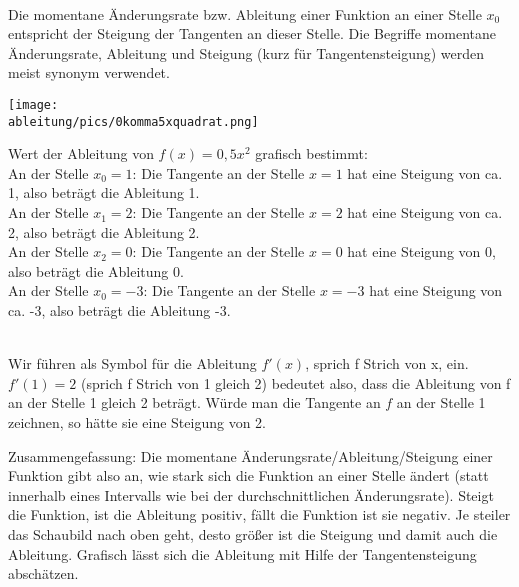 \documentclass[a4paper,12pt, headsepline, ngerman]{scrartcl}
\theoremstyle{definition}
\begin{document}
\begin{tcolorbox}
	\phantom{ }\\
	\textcolor{loestc}{Die momentane Änderungsrate bzw. Ableitung einer Funktion an einer Stelle \(x_0\) entspricht der Steigung der Tangenten an dieser Stelle. Die Begriffe momentane Änderungsrate, Ableitung und Steigung (kurz für Tangentensteigung) werden meist synonym verwendet.}\\
\end{tcolorbox}
\begin{minipage}{\textwidth}
	\begin{minipage}{0.49\textwidth}
		\centering\texttt{[image: \\ableitung/pics/0komma5xquadrat.png]}
	\end{minipage}
	\begin{minipage}{0.49\textwidth}
		Wert der Ableitung von \(f(x)=0,5x^2\) grafisch bestimmt:\\
		An der Stelle \(x_0=1\): Die Tangente an der Stelle \(x=1\) hat eine Steigung von ca. 1, also beträgt die Ableitung 1.\\
		An der Stelle \(x_1=2\): \textcolor{loes}{Die Tangente an der Stelle \(x=2\) hat eine Steigung von ca. 2, also beträgt die Ableitung 2.}\\
		An der Stelle \(x_2=0\): \textcolor{loes}{Die Tangente an der Stelle \(x=0\) hat eine Steigung von 0, also beträgt die Ableitung 0.}\\
		An der Stelle \(x_0=-3\): \textcolor{loes}{Die Tangente an der Stelle \(x=-3\) hat eine Steigung von ca. -3, also beträgt die Ableitung -3.}\\
	\end{minipage}
\end{minipage}
\begin{tcolorbox}
	\phantom{ }\\
	\textcolor{loestc}{Wir führen als Symbol für die Ableitung \(f'(x)\), sprich f Strich von x, ein.\\
	\(f'(1)=2\) (sprich f Strich von 1 gleich 2) bedeutet also, dass die Ableitung von f an der Stelle 1 gleich 2 beträgt. Würde man die Tangente an \(f\) an der Stelle 1 zeichnen, so hätte sie eine Steigung von 2.}\\
\end{tcolorbox}
Zusammengefassung: Die momentane Änderungsrate/Ableitung/Steigung einer Funktion gibt also an, wie stark sich die Funktion an einer Stelle ändert (statt innerhalb eines Intervalls wie bei der durchschnittlichen Änderungsrate). Steigt die Funktion, ist die Ableitung positiv, fällt die Funktion ist sie negativ. Je steiler das Schaubild nach oben geht, desto größer ist die Steigung und damit auch die Ableitung. Grafisch lässt sich die Ableitung mit Hilfe der Tangentensteigung abschätzen.
\end{document}
